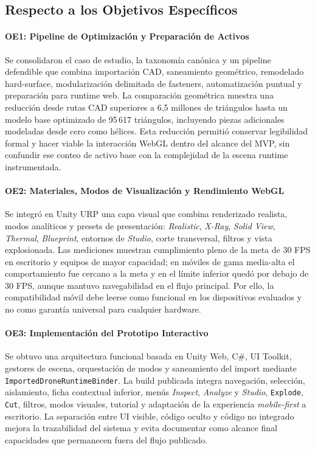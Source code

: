 \subsection{Respecto a los Objetivos Específicos}

\paragraph{OE1: Pipeline de Optimización y Preparación de Activos} Se consolidaron el caso de estudio, la taxonomía canónica y un pipeline defendible que combina importación CAD, saneamiento geométrico, remodelado hard-surface, modularización delimitada de fasteners, automatización puntual y preparación para runtime web. La comparación geométrica muestra una reducción desde rutas CAD superiores a 6,5 millones de triángulos hasta un modelo base optimizado de 95\,617 triángulos, incluyendo piezas adicionales modeladas desde cero como hélices. Esta reducción permitió conservar legibilidad formal y hacer viable la interacción WebGL dentro del alcance del MVP, sin confundir ese conteo de activo base con la complejidad de la escena runtime instrumentada.

\paragraph{OE2: Materiales, Modos de Visualización y Rendimiento WebGL} Se integró en Unity URP una capa visual que combina renderizado realista, modos analíticos y presets de presentación: \textit{Realistic}, \textit{X-Ray}, \textit{Solid View}, \textit{Thermal}, \textit{Blueprint}, entornos de \textit{Studio}, corte transversal, filtros y vista explosionada. Las mediciones muestran cumplimiento pleno de la meta de 30 FPS en escritorio y equipos de mayor capacidad; en móviles de gama media-alta el comportamiento fue cercano a la meta y en el límite inferior quedó por debajo de 30 FPS, aunque mantuvo navegabilidad en el flujo principal. Por ello, la compatibilidad móvil debe leerse como funcional en los dispositivos evaluados y no como garantía universal para cualquier hardware.

\paragraph{OE3: Implementación del Prototipo Interactivo} Se obtuvo una arquitectura funcional basada en Unity Web, C\#, UI Toolkit, gestores de escena, orquestación de modos y saneamiento del import mediante \texttt{ImportedDroneRuntimeBinder}. La build publicada integra navegación, selección, aislamiento, ficha contextual inferior, menús \textit{Inspect}, \textit{Analyze} y \textit{Studio}, \texttt{Explode}, \texttt{Cut}, filtros, modos visuales, tutorial y adaptación de la experiencia \textit{mobile-first} a escritorio. La separación entre UI visible, código oculto y código no integrado mejora la trazabilidad del sistema y evita documentar como alcance final capacidades que permanecen fuera del flujo publicado.

